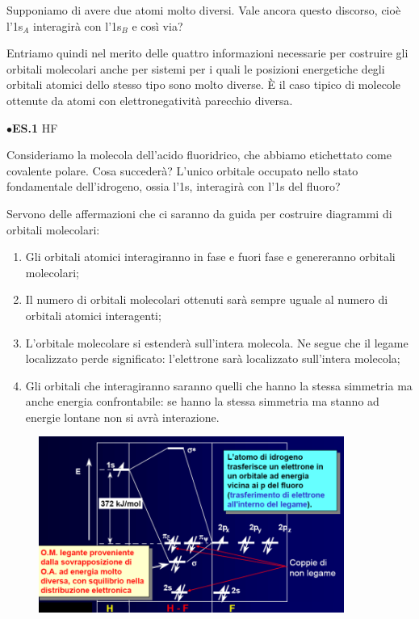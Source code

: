 Supponiamo di avere due atomi molto diversi. Vale ancora questo discorso, cioè l'1s$_A$ interagirà con l'1s$_B$ e così via?

Entriamo quindi nel merito delle quattro informazioni necessarie per costruire gli orbitali molecolari anche per sistemi per i quali le posizioni energetiche degli orbitali atomici dello stesso tipo sono molto diverse. È il caso tipico di molecole ottenute da atomi con elettronegatività parecchio diversa.

\vspace{0.2cm}$\bullet$\textbf{ES.1} HF

Consideriamo la molecola dell'acido fluoridrico, che abbiamo etichettato come covalente polare. Cosa succederà? L'unico orbitale occupato nello stato fondamentale dell'idrogeno, ossia l'1s, interagirà con l'1s del fluoro?

\vspace{0.2cm}Servono delle affermazioni che ci saranno da guida per costruire diagrammi di orbitali molecolari:

\begin{enumerate}
    \item Gli orbitali atomici interagiranno in fase e fuori fase e genereranno orbitali molecolari;
    \item Il numero di orbitali molecolari ottenuti sarà sempre uguale al numero di orbitali atomici interagenti;
    \item L'orbitale molecolare si estenderà sull'intera molecola. Ne segue che il legame localizzato perde significato: l'elettrone sarà localizzato sull'intera molecola;
    \item Gli orbitali che interagiranno saranno quelli che hanno la stessa simmetria ma anche energia confrontabile: se hanno la stessa simmetria ma stanno ad energie lontane non si avrà interazione.
\end{enumerate}

\begin{figure}[htp]
    \centering
    \includegraphics[width=10cm]{immagini/orbitali_molecolari_HF.png}
\end{figure}

